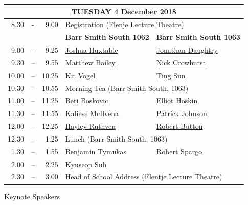 \documentclass[twoside,14pt,a4paper,notitlepage]{memoir}
\begin{document}
\pagebreak
\vspace*{0cm}
\begin{center}
\begin{tabular}{rcr|p{3.6cm}|p{3.6cm}}
\multicolumn{5}{c}{{\large TUESDAY 4 December 2018}} \\ \hline
8.30 & - & 9.00 & \multicolumn{2}{l}{Registration (Flenje Lecture Theatre)} \\ \hline
 & & & \textbf{Barr Smith South 1062} & \textbf{Barr Smith South 1063} \\ \hline
9.00 & - & 9.25 &
 \hyperref[aut:huxtable]{Joshua Huxtable} &
 \hyperref[aut:daughtry]{Jonathan Daughtry} \\ \hline
9.30 & – & 9.55 &
 \hyperref[aut:bailey]{Matthew Bailey} &
 \hyperref[aut:crowhurst]{Nick Crowhurst} \\ \hline
10.00 & – & 10.25 &
\hyperref[aut:vogel]{Kit Vogel} &
\hyperref[aut:sun]{Ting Sun} \\ \hline
10.30 & – & 10.55 & \multicolumn{2}{l}{Morning Tea (Barr Smith South, 1063)} \\ \hline
11.00 & – & 11.25 & 
 \hyperref[aut:boskovic]{Beti Boskovic} &
 \hyperref[aut:hoskin]{Elliot Hoskin} \\ \hline
11.30 & – & 11.55 &
 \hyperref[aut:mcilvena]{Kaliese McIlvena} &
 \hyperref[aut:johnson]{Patrick Johnson} \\ \hline
12.00 & – & 12.25 &
 \hyperref[aut:ruthven]{Hayley Ruthven} &
 \hyperref[aut:button]{Robert Button} \\ \hline
12.30 & – & 1.25 & \multicolumn{2}{l}{Lunch (Barr Smith South, 1063)} \\ \hline
1.30 & – & 1.55 &
 \hyperref[aut:tymukas]{Benjamin Tymukas} &
 \hyperref[aut:spargo]{Robert Spargo} \\ \hline
2.00 & – & 2.25 & 
\hyperref[aut:suh]{Kyuseop Suh} & \\ \hline
2.30 & – & 3.00 & \multicolumn{2}{l}{Head of School Address (Flentje Lecture Theatre)} \\ \hline
\end{tabular}
\end{center}






\clearpage{}
\vspace*{2cm}
{\Huge Keynote Speakers}
\vspace{2cm}
\end{document}
